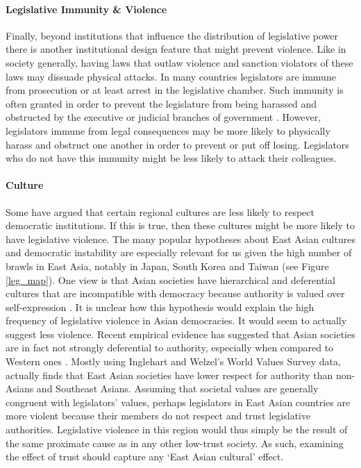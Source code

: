 \documentclass[a4paper]{article}\usepackage{graphicx, color}
\begin{document}
\paragraph{Legislative Immunity \& Violence}

Finally, beyond institutions that influence the distribution of legislative power there is another institutional design feature that might prevent violence. Like in society generally, having laws that outlaw violence and sanction violators of these laws may dissuade physical attacks. In many countries legislators are immune from prosecution or at least arrest in the legislative chamber. Such immunity is often granted in order to prevent the legislature from being harassed and obstructed by the executive or judicial branches of government  \citep{Seghetti1984}. However, legislators immune from legal consequences may be more likely to physically harass and obstruct one another in order to prevent or put off losing. Legislators who do not have this immunity might be less likely to attack their colleagues. 

\paragraph{Culture}

Some have argued that certain regional cultures are less likely to respect democratic institutions. If this is true, then these cultures might be more likely to have legislative violence. The many popular hypotheses about East Asian cultures and democratic instability are especially relevant for us given the high number of brawls in East Asia, notably in Japan, South Korea and Taiwan (see Figure \ref{leg_map}). One view is that Asian societies have hierarchical and deferential cultures that are incompatible with democracy because authority is valued over self-expression \citep[see][212-213 for a discussion]{Dalton2005}. It is unclear how this hypothesis would explain the high frequency of legislative violence in Asian democracies. It would seem to actually suggest less violence. Recent empirical evidence has suggested that Asian societies are in fact not strongly deferential to authority, especially when compared to Western ones \citep{Dalton2005, KimAsianValues2010}. Mostly using Inglehart and Welzel's World Values Survey data, \cite{KimAsianValues2010} actually finds that East Asian societies have lower respect for authority than non-Asians and Southeast Asians. Assuming that societal values are generally congruent with legislators' values, perhaps legislators in East Asian countries are more violent because their members do not respect and trust legislative authorities. Legislative violence in this region would thus simply be the result of the same proximate cause as in any other low-trust society. As such, examining the effect of trust should capture any `East Asian cultural' effect. 
\end{document}
